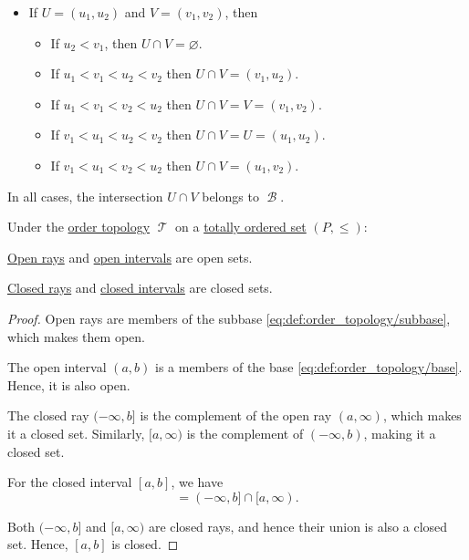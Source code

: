 \begin{defproof}
\begin{itemize}
    \item If \( U = (u_1, u_2) \) and \( V = (v_1, v_2) \), then
    \begin{itemize}
      \item If \( u_2 < v_1 \), then \( U \cap V = \varnothing \).
      \item If \( u_1 < v_1 < u_2 < v_2 \) then \( U \cap V = (v_1, u_2) \).
      \item If \( u_1 < v_1 < v_2 < u_2 \) then \( U \cap V = V = (v_1, v_2) \).
      \item If \( v_1 < u_1 < u_2 < v_2 \) then \( U \cap V = U = (u_1, u_2) \).
      \item If \( v_1 < u_1 < v_2 < u_2 \) then \( U \cap V = (u_1, v_2) \).
    \end{itemize}
  \end{itemize}

  In all cases, the intersection \( U \cap V \) belongs to \( \mscrB \).
\end{defproof}

\begin{proposition}\label{thm:order_topology_intervals}
  Under the \hyperref[def:order_topology]{order topology} \( \mscrT \) on a \hyperref[def:totally_ordered_set]{totally ordered set} \( (P, \leq) \):
  \begin{thmenum}
     \hyperref[def:order_interval/ray]{Open rays} and \hyperref[def:order_interval/open]{open intervals} are open sets.

     \hyperref[def:order_interval/ray]{Closed rays} and \hyperref[def:order_interval/closed]{closed intervals} are closed sets.
  \end{thmenum}
\end{proposition}
\begin{proof}
   Open rays are members of the subbase \eqref{eq:def:order_topology/subbase}, which makes them open.

  The open interval \( (a, b) \) is a members of the base \eqref{eq:def:order_topology/base}. Hence, it is also open.

   The closed ray \( (-\infty, b] \) is the complement of the open ray \( (a, \infty) \), which makes it a closed set. Similarly, \( [a, \infty) \) is the complement of \( (-\infty, b) \), making it a closed set.

  For the closed interval \( [a, b] \), we have
  \begin{equation*}
    [a, b] = (-\infty, b] \cap [a, \infty).
  \end{equation*}

  Both \( (-\infty, b] \) and \( [a, \infty) \) are closed rays, and hence their union is also a closed set. Hence, \( [a, b] \) is closed.
\end{proof}

